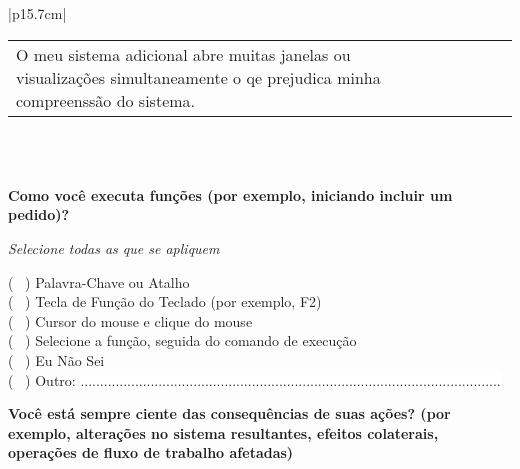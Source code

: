 \begin{longtable}{|p{15.7cm}|}
\begin{tabularx}{15.7 cm}{|X|X|X|X|X|X|X|}
	& {\rotatebox[origin=c]{90}{\parbox[c]{2.5cm}{\centering \textcolor{white}{.}\newline \medskip Concordo Parcialmente}}} 
	& {\rotatebox[origin=c]{90}{\parbox[c]{2.5cm}{\centering \textcolor{white}{.}\newline \medskip Não Concordo \newline Nem Discordo}}}	 
	& {\rotatebox[origin=c]{90}{\parbox[c]{2.5cm}{\centering \textcolor{white}{.}\newline \medskip Discordo  Parcialmente }}} 
	& {\rotatebox[origin=c]{90}{\parbox[c]{2.5cm}{\centering \textcolor{white}{.}\newline \medskip Discordo  Completamente  }}}
	& {\rotatebox[origin=c]{90}{\parbox[c]{2.5cm}{\centering \textcolor{white}{.}\newline  \textcolor{white}{.}\newline Eu Não Sei }}} \\
	\hline
	O meu sistema adicional abre muitas janelas ou visualizações simultaneamente o qe prejudica minha compreenssão do sistema. &   &   &   &   &   &  \\
	\hline
	\end{tabularx}\\
	\\
	\begin{Spacing}{0.8} \end{Spacing}
	\begin{Spacing}{0.8} 
		\textbf{Como você executa funções (por exemplo, iniciando incluir um pedido)?} \end{Spacing} 
	\begin{Spacing}{2.0} 
		\tiny \textit{Selecione todas as que se apliquem} \end{Spacing} 
	( \ ) Palavra-Chave ou Atalho \\
	( \ ) Tecla de Função do Teclado (por exemplo, F2) \\
	( \ ) Cursor do mouse e clique do mouse \\
	( \ ) Selecione a função, seguida do comando de execução \\
	( \ ) Eu Não Sei \\
	( \ ) Outro: \colorbox{white}{ ............................................................................................................ } \\
	\begin{Spacing}{0.8} \end{Spacing}
	\begin{Spacing}{0.8} 
	\textbf{Você está sempre ciente das consequências de suas ações? (por exemplo, alterações no sistema resultantes, efeitos colaterais, operações de fluxo de trabalho afetadas)} \end{Spacing} 

\end{longtable}

